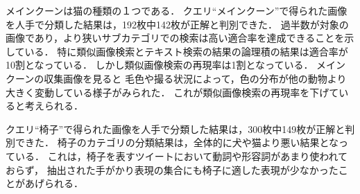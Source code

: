 メインクーンは猫の種類の１つである．
クエリ``メインクーン''で得られた画像を人手で分類した結果は，192枚中142枚が正解と判別できた．
過半数が対象の画像であり，より狭いサブカテゴリでの検索は高い適合率を達成できることを示している．
特に類似画像検索とテキスト検索の結果の論理積の結果は適合率が10割となっている．
しかし類似画像検索の再現率は1割となっている．
メインクーンの収集画像を見ると
毛色や撮る状況によって，色の分布が他の動物より大きく変動している様子がみられた．
これが類似画像検索の再現率を下げていると考えられる．


クエリ``椅子''で得られた画像を人手で分類した結果は，300枚中149枚が正解と判別できた．
椅子のカテゴリの分類結果は，全体的に犬や猫より悪い結果となっている．
これは，椅子を表すツイートにおいて動詞や形容詞があまり使われておらず，
抽出された手がかり表現の集合にも椅子に適した表現が少なかったことがあげられる．







